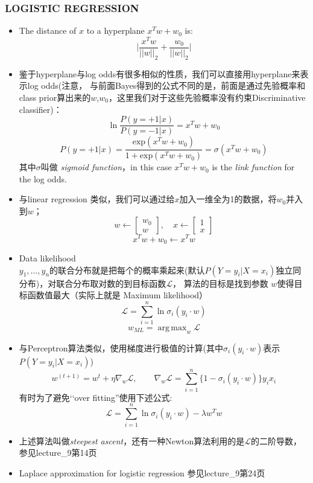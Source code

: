 \documentclass{article} 	%
\DeclareMathOperator*{\argmax}{arg\,max}
\begin{document}
		\subsubsection{LOGISTIC REGRESSION}
			\begin{itemize}
			\item
			The distance of $x$ to a hyperplane $x^Tw + w_0$ is:
			$$\Big|\frac{x^Tw}{||w||_2} + \frac{w_0}{||w||_2}\Big|$$
			\item
			鉴于hyperplane与log odds有很多相似的性质，我们可以直接用hyperplane来表示log odds(注意，
			与前面Bayes得到的公式不同的是，前面是通过先验概率和class prior算出来的$w$,$w_0$，这里我们对于这些先验概率没有约束Discriminative
			 classifier)：
			$$\ln \frac{P(y = +1|x)}{P(y = -1|x)} = x^Tw+w_0$$
			$$P(y=+1|x) = \frac{\mathrm{exp}(x^Tw+w_0)}{1+\mathrm{exp}(x^Tw+w_0)}=\sigma(x^Tw+w_0)$$
			其中$\sigma$叫做 \emph{sigmoid function}，in this case $x^Tw+w_0$ is the \emph{link function} for the log odds.
			\item
			与linear regression 类似，我们可以通过给$x$加入一维全为1的数据，将$w_0$并入到$w$；
			$$
			w\gets\left[ 
			\begin{array}{c}
			w_0\\w
			\end{array}\right],\quad
			x\gets\left[
			\begin{array}{c}
			1\\x
			\end{array}
			\right]
			$$
			$$x^Tw + w_0\gets x^Tw$$
			\item
			Data likelihood\\
			$y_1,\ldots,y_n$的联合分布就是把每个的概率乘起来(默认$P(Y = y_i|X=x_i)$独立同分布)，对联合分布取对数的到目标函数$\mathcal{L}$，
			算法的目标是找到参数
			$w$使得目标函数值最大（实际上就是 Maximum likelihood）\\
			$$\mathcal{L} = \sum_{i=1}^n\ln \sigma_i(y_i\cdot w)$$
			$$w_{\scriptscriptstyle{ML}} = \argmax_{w}\mathcal{L}$$
			\item
			与Perceptron算法类似，使用梯度进行极值的计算(其中$\sigma_i(y_i\cdot w)$表示$P(Y = y_i|X=x_i)$)\\
			$$w^{(t+1)}=w^t + \eta \nabla_w\mathcal{L},\quad \quad \nabla_w\mathcal{L} = \sum_{i=1}^n\{1-\sigma_i(y_i\cdot w)\}y_ix_i$$
			有时为了避免‘‘over fitting''使用下述公式:
			$$\mathcal{L} = \sum_{i=1}^n\ln \sigma_i(y_i\cdot w) - \lambda w^Tw$$
			\item
			上述算法叫做\emph{steepest ascent}，还有一种Newton算法利用的是$\mathcal{L}$的二阶导数，参见lecture\_9第14页\\
			\item
			Laplace approximation for logistic regression 参见lecture\_9第24页\\
			\end{itemize}
\end{document}
